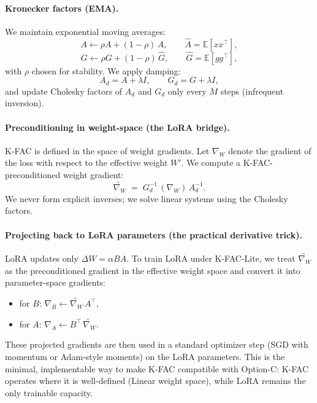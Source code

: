 \paragraph{Kronecker factors (EMA).}
We maintain exponential moving averages:
\[
A \leftarrow \rho A + (1-\rho)\,\widehat{A},\qquad
\widehat{A} = \mathbb{E}[x x^\top],
\]
\[
G \leftarrow \rho G + (1-\rho)\,\widehat{G},\qquad
\widehat{G} = \mathbb{E}[g g^\top],
\]
with $\rho$ chosen for stability. We apply damping:
\[
A_d = A + \lambda I,\qquad G_d = G + \lambda I,
\]
and update Cholesky factors of $A_d$ and $G_d$ only every $M$ steps (infrequent inversion).

\paragraph{Preconditioning in weight-space (the LoRA bridge).}
K-FAC is defined in the space of weight gradients. Let $\nabla_W$ denote the gradient of the loss with respect to the effective weight $W'$. We compute a K-FAC-preconditioned weight gradient:
\[
\widetilde{\nabla_W}
\;=\;
G_d^{-1}\,(\nabla_W)\,A_d^{-1}.
\]
We never form explicit inverses; we solve linear systems using the Cholesky factors.

\paragraph{Projecting back to LoRA parameters (the practical derivative trick).}
LoRA updates only $\Delta W = \alpha B A$. To train LoRA under K-FAC-Lite, we treat $\widetilde{\nabla_W}$ as the preconditioned gradient in the effective weight space and convert it into parameter-space gradients:
\begin{itemize}[leftmargin=*,itemsep=2pt]
\item for $B$: $\nabla_B \leftarrow \widetilde{\nabla_W}\,A^\top$,
\item for $A$: $\nabla_A \leftarrow B^\top\,\widetilde{\nabla_W}$.
\end{itemize}
These projected gradients are then used in a standard optimizer step (SGD with momentum or Adam-style moments) on the LoRA parameters. This is the minimal, implementable way to make K-FAC compatible with Option-C: K-FAC operates where it is well-defined (Linear weight space), while LoRA remains the only trainable capacity.

